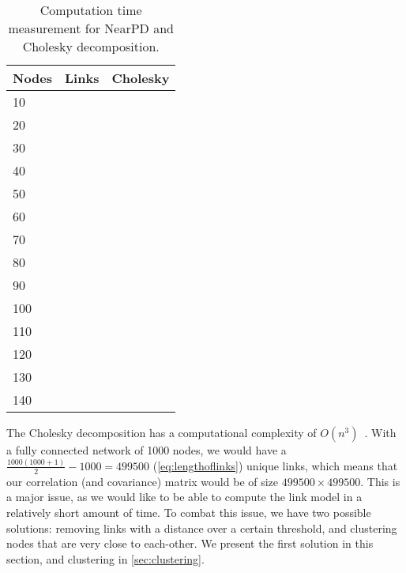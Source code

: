 \begin{table}[H]
    \centering
    \begin{tabular}{|l|l|l|}
        \hline
        Nodes & Links & Cholesky \\\hline
        10    &       &          \\\hline
        20    &       &          \\\hline
        30    &       &          \\\hline
        40    &       &          \\\hline
        50    &       &          \\\hline
        60    &       &          \\\hline
        70    &       &          \\\hline
        80    &       &          \\\hline
        90    &       &          \\\hline
        100   &       &          \\\hline
        110   &       &          \\\hline
        120   &       &          \\\hline
        130   &       &          \\\hline
        140   &       &          \\\hline
    \end{tabular}
    \caption{Computation time measurement for NearPD and Cholesky decomposition.}
    \label{table:spdcholeskytime}
\end{table}


The Cholesky decomposition has a computational complexity of $O(n^3)$~\citationneeded. With a fully connected network of 1000 nodes, we would have a $\frac{1000(1000+1)}{2} - 1000 = 499500$ (\autoref{eq:lengthoflinks}) unique links, which means that our correlation (and covariance) matrix would be of size $499500 \times 499500$. This is a major issue, as we would like to be able to compute the link model in a relatively short amount of time. To combat this issue, we have two possible solutions: removing links with a distance over a certain threshold, and clustering nodes that are very close to each-other. We present the first solution in this section, and clustering in \autoref{sec:clustering}.\medbreak

